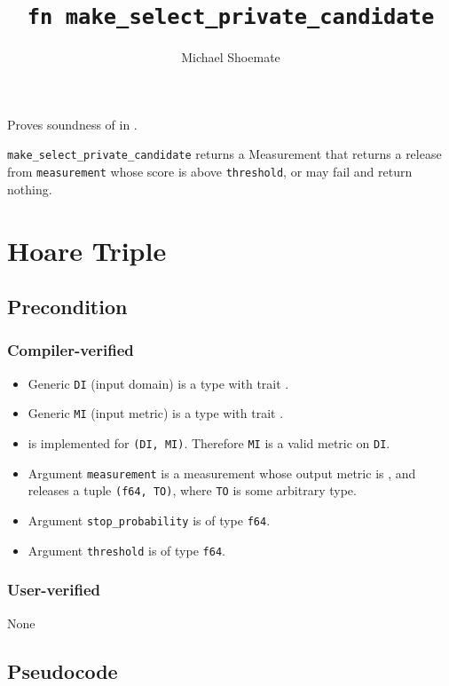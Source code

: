 \documentclass{article}
\title{\texttt{fn make\_select\_private\_candidate}}
\author{Michael Shoemate}
\date{}
\begin{document}
\maketitle

\contrib
Proves soundness of  in .

\texttt{make\_select\_private\_candidate} returns a Measurement that returns a release from \texttt{measurement} whose score is above \texttt{threshold},
or may fail and return nothing.

\section{Hoare Triple}
\subsection*{Precondition}
\subsubsection*{Compiler-verified}
\begin{itemize}
    \item Generic \texttt{DI} (input domain) is a type with trait .
    \item Generic \texttt{MI} (input metric) is a type with trait .
    \item {} is implemented for \texttt{(DI, MI)}. Therefore \texttt{MI} is a valid metric on \texttt{DI}.
    \item Argument \texttt{measurement} is a measurement whose output metric is , and releases a tuple \texttt{(f64, TO)}, where \texttt{TO} is some arbitrary type.
    \item Argument \texttt{stop\_probability} is of type \texttt{f64}.
    \item Argument \texttt{threshold} is of type \texttt{f64}.
\end{itemize}

\subsubsection*{User-verified}
None

\subsection*{Pseudocode}

\end{document}
